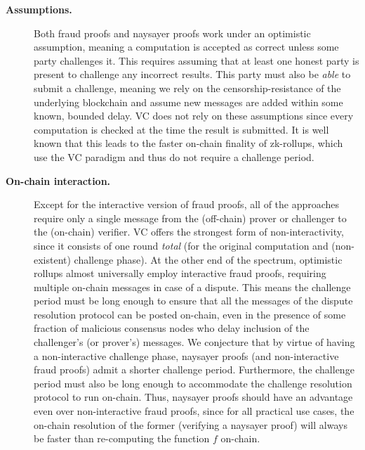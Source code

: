 \begin{description}
   \item[\textbf{Assumptions.}]
   Both fraud proofs and naysayer proofs work under an optimistic assumption, meaning a computation is accepted as correct unless some party challenges it. This requires assuming that at least one honest party is present to challenge any incorrect results. This party must also be \emph{able} to submit a challenge, meaning we rely on the censorship-resistance of the underlying blockchain and assume new messages are added within some known, bounded delay. VC does not rely on these assumptions since every computation is checked at the time the result is submitted. It is well known that this leads to the faster on-chain finality of zk-rollups, which use the VC paradigm and thus do not require a challenge period.
   
   \item[\textbf{On-chain interaction.}]
   Except for the interactive version of fraud proofs, all of the approaches require only a single message from the (off-chain) prover or challenger to the (on-chain) verifier. VC offers the strongest form of non-interactivity, since it consists of one round \emph{total} (for the original computation and (non-existent) challenge phase). At the other end of the spectrum, optimistic rollups almost universally employ interactive fraud proofs, requiring multiple on-chain messages in case of a dispute. This means the challenge period must be long enough to ensure that all the messages of the dispute resolution protocol can be posted on-chain, even in the presence of some fraction of malicious consensus nodes who delay inclusion of the challenger's (or prover's) messages. We conjecture that by virtue of having a non-interactive challenge phase, naysayer proofs (and non-interactive fraud proofs) admit a shorter challenge period. Furthermore, the challenge period must also be long enough to accommodate the challenge resolution protocol to run on-chain. Thus, naysayer proofs should have an advantage even over non-interactive fraud proofs, since for all practical use cases, the on-chain resolution of the former (verifying a naysayer proof) will always be faster than re-computing the function $f$ on-chain.
    

\end{description}

